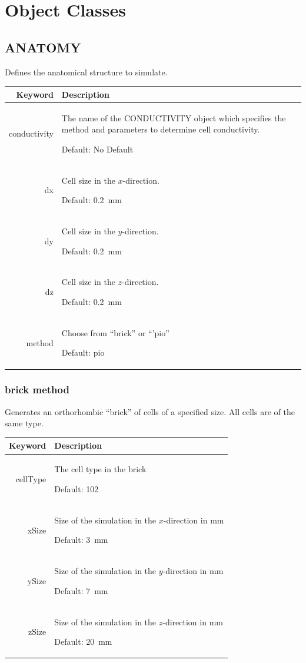 \documentclass{article}
\begin{document}
\appendix

\section{Object Classes}

\newenvironment{keywords}
{
  \par\vspace{12pt}\noindent
  \begin{tabular}{|r|p{0.7\textwidth}|}
    \hline
    Keyword & Description \\ \hline
  }
  {
  \end{tabular}\par
}

\def\kw#1#2#3{%
  #1 & {#2 \par Default: #3}\\ \hline%
}


\subsection{ANATOMY}

Defines the anatomical structure to simulate.

\begin{keywords}
  \kw{conductivity}{The name of the CONDUCTIVITY object which specifies
    the method and parameters to determine cell conductivity.}{No Default}
  \kw{dx}{Cell size in the $x$-direction.}{0.2~mm}
  \kw{dy}{Cell size in the $y$-direction.}{0.2~mm}
  \kw{dz}{Cell size in the $z$-direction.}{0.2~mm}
  \kw{method}{Choose from ``brick'' or ``'pio''}{pio}
\end{keywords}


\subsubsection{brick method}

Generates an orthorhombic ``brick'' of cells of a specified size.  All
cells are of the same type.


\begin{keywords}
  \kw{cellType}{The cell type in the brick}{102}
  \kw{xSize}{Size of the simulation in the $x$-direction in mm}{3~mm}
  \kw{ySize}{Size of the simulation in the $y$-direction in mm}{7~mm}
  \kw{zSize}{Size of the simulation in the $z$-direction in mm}{20~mm}
\end{keywords}
\end{document}
